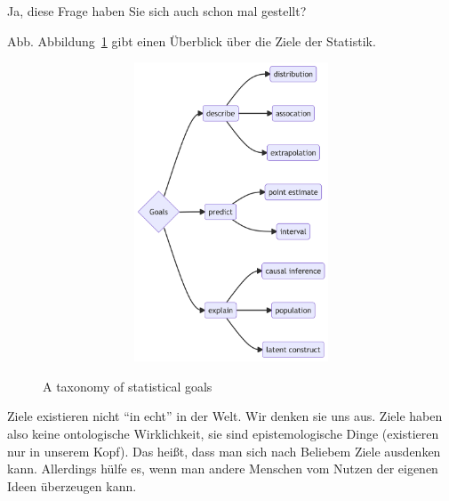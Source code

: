 \documentclass[
  a4paper,
  DIV=11]{scrreprt}
\theoremstyle{definition}
\theoremstyle{remark}
\begin{document}
Ja, diese Frage haben Sie sich auch schon mal gestellt?

Abb. Abbildung~\ref{fig-goals} gibt einen Überblick über die Ziele der
Statistik.

\begin{figure}

{\centering 

\begin{figure}[H]

{\centering \includegraphics[width=5.5in,height=3.5in]{./Inferenz_files/figure-latex/mermaid-figure-1.png}

}

\end{figure}

}

\caption{\label{fig-goals}A taxonomy of statistical goals}

\end{figure}

\begin{tcolorbox}[enhanced jigsaw, colframe=quarto-callout-note-color-frame, title=\textcolor{quarto-callout-note-color}{\faInfo}\hspace{0.5em}{Hinweis}, breakable, leftrule=.75mm, coltitle=black, toptitle=1mm, bottomrule=.15mm, bottomtitle=1mm, opacityback=0, arc=.35mm, rightrule=.15mm, left=2mm, colbacktitle=quarto-callout-note-color!10!white, opacitybacktitle=0.6, toprule=.15mm, titlerule=0mm, colback=white]
Ziele existieren nicht ``in echt'' in der Welt. Wir denken sie uns aus.
Ziele haben also keine ontologische Wirklichkeit, sie sind
epistemologische Dinge (existieren nur in unserem Kopf). Das heißt, dass
man sich nach Beliebem Ziele ausdenken kann. Allerdings hülfe es, wenn
man andere Menschen vom Nutzen der eigenen Ideen überzeugen kann.
\end{tcolorbox}
\end{document}
